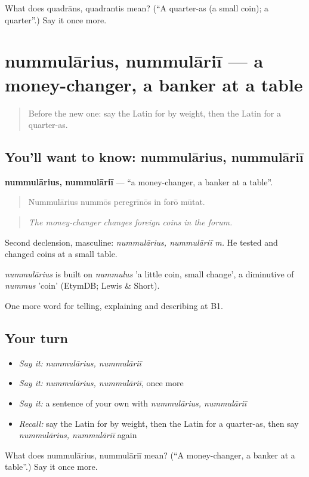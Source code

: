 \begin{tcolorbox}[breakable,colback=teal!4,colframe=teal!35!black,title={Before you move on}]
What does quadrāns, quadrantis mean? (\textquotedblleft{}A quarter-as (a small coin); a quarter\textquotedblright{}.) Say it once more.
\end{tcolorbox}
\section[nummulārius, nummulāriī]{nummulārius, nummulāriī — a money-changer, a banker at a table}

\label{lesson:LA-C465-nummularius}



\begin{quote}
Before the new one: say the Latin for by weight, then the Latin for a quarter-as.
\end{quote}

\subsection*{You'll want to know: nummulārius, nummulāriī}
\textbf{nummulārius, nummulāriī} — \textquotedblleft{}a money-changer, a banker at a table\textquotedblright{}.

\begin{quote}
Nummulārius nummōs peregrīnōs in forō mūtat.
\end{quote}

\begin{quote}
\emph{The money-changer changes foreign coins in the forum.}
\end{quote}

Second declension, masculine: \emph{nummulārius, nummulāriī m.} He tested and changed coins at a small table.

\begin{cousinweb}
\emph{nummulārius} is built on \emph{nummulus} 'a little coin, small change', a diminutive of \emph{nummus} 'coin' (EtymDB; Lewis \& Short).
\end{cousinweb}

\begin{grammarlens}[title={What you've built}]
One more word for telling, explaining and describing at B1.
\end{grammarlens}

\subsection*{Your turn}
\begin{itemize}
\raggedright
  \item \emph{Say it:} \emph{nummulārius, nummulāriī}
  \item \emph{Say it:} \emph{nummulārius, nummulāriī}, once more
  \item \emph{Say it:} a sentence of your own with \emph{nummulārius, nummulāriī}
  \item \emph{Recall:} say the Latin for by weight, then the Latin for a quarter-as, then say \emph{nummulārius, nummulāriī} again
\end{itemize}

\begin{tcolorbox}[breakable,colback=teal!4,colframe=teal!35!black,title={Before you move on}]
What does nummulārius, nummulāriī mean? (\textquotedblleft{}A money-changer, a banker at a table\textquotedblright{}.) Say it once more.
\end{tcolorbox}

